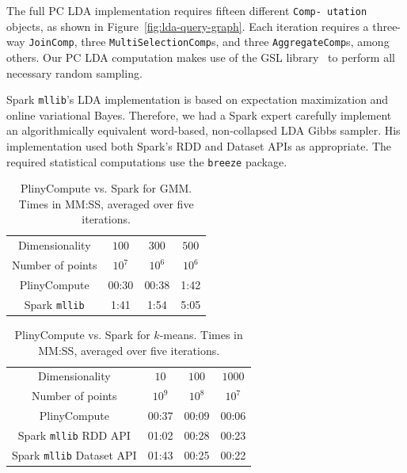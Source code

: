 \vspace{5pt}

The full PC LDA implementation requires fifteen different
\texttt{Comp- utation} objects, as shown 
in Figure~\ref{fig:lda-query-graph}.  Each iteration requires a 
three-way \texttt{JoinComp}, three \texttt{MultiSelectionComp}s, and three
\texttt{AggregateComp}s, among others. 
Our PC LDA computation makes use of the GSL library~\cite{gsl} to perform all necessary random sampling.

Spark \texttt{mllib}'s LDA implementation is based on expectation
maximization and online variational Bayes.
Therefore, we had a Spark expert 
carefully implement an algorithmically
equivalent word-based, non-collapsed LDA Gibbs sampler.  His implementation used both
Spark's RDD and Dataset        
APIs as appropriate.
The required statistical computations use the
\texttt{breeze} package. 


\begin{table}[t]
\small
\begin{center}
\begin{tabular}{|c||c|c|c|}
\hline
Dimensionality & $100$ & $300$ & $500$ \\
Number of points & $10^7$ & $10^6$ & $10^6$ \\
\hline
\hline
PlinyCompute &00:30 & 00:38 & 1:42 \\
Spark \texttt{mllib} &1:41  &1:54 &5:05 \\
\hline
\end{tabular}
\caption{PlinyCompute vs. Spark for GMM. Times in MM:SS, averaged over five iterations.}
\label{fig:Gmm}
\end{center}
\vspace{-20pt}
\end{table}

\begin{table}[t]
\small
\begin{center}
\begin{tabular}{|c||c|c|c|}
\hline
Dimensionality & $10$ & $100$ & $1000$ \\
Number of points & $10^9$ & $10^8$ & $10^7$ \\
\hline
\hline
PlinyCompute &00:37 & 00:09 & 00:06 \\
Spark \texttt{mllib} RDD API &01:02 & 00:28 & 00:23 \\
Spark \texttt{mllib} Dataset API&01:43 & 00:25 & 00:22 \\
\hline
\end{tabular}
\caption{PlinyCompute vs. Spark for $k$-means. Times in MM:SS, averaged over five iterations.}
\label{fig:KMeans}
\end{center}
\vspace{-20pt}
\end{table}

